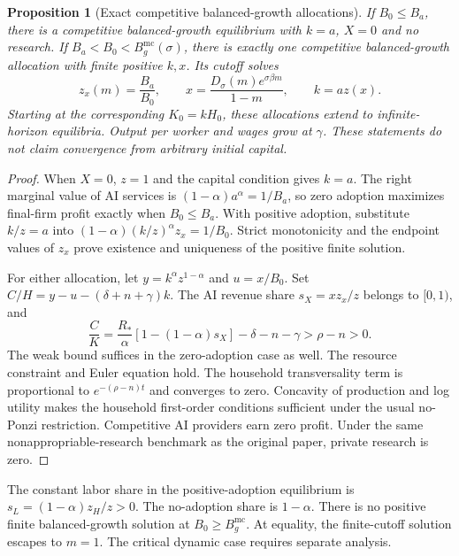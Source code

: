 \documentclass[11pt]{article}
\newtheorem{proposition}{Proposition}
\begin{document}
\begin{proposition}[Exact competitive balanced-growth allocations]
If $B_0\leq B_a$, there is a competitive balanced-growth equilibrium with
$k=a$, $X=0$ and no research. If
$B_a<B_0<B_g^{\mathrm{mc}}(\sigma)$, there is exactly one competitive
balanced-growth allocation with finite positive $k,x$. Its cutoff solves
\begin{equation}
 z_x(m)=\frac{B_a}{B_0},\qquad
 x=\frac{D_\sigma(m)e^{\sigma\beta m}}{1-m},\qquad k=a z(x).
 \label{eq:regimes-coexistence}
\end{equation}
Starting at the corresponding $K_0=kH_0$, these allocations extend to
infinite-horizon equilibria. Output per worker and wages grow at $\gamma$.
These statements do not claim convergence from arbitrary initial capital.
\end{proposition}
\begin{proof}
When $X=0$, $z=1$ and the capital condition gives $k=a$.
The right marginal value of AI services is $(1-\alpha)a^\alpha=1/B_a$,
so zero adoption maximizes final-firm profit exactly when $B_0\leq B_a$.
With positive adoption, substitute $k/z=a$ into
$(1-\alpha)(k/z)^\alpha z_x=1/B_0$. Strict monotonicity and the endpoint
values of $z_x$ prove existence and uniqueness of the positive finite solution.

For either allocation, let $y=k^\alpha z^{1-\alpha}$ and $u=x/B_0$.
Set $C/H=y-u-(\delta+n+\gamma)k$. The AI revenue share
$s_X=xz_x/z$ belongs to $[0,1)$, and
\[
 \frac{C}{K}=\frac{R_*}{\alpha}
 [1-(1-\alpha)s_X]-\delta-n-\gamma>\rho-n>0.
\]
The weak bound suffices in the zero-adoption case as well.
The resource constraint and Euler equation hold. The household transversality
term is proportional to $e^{-(\rho-n)t}$ and converges to zero.
Concavity of production and log utility makes the household first-order
conditions sufficient under the usual no-Ponzi restriction. Competitive
AI providers earn zero profit. Under the same nonappropriable-research
benchmark as the original paper, private research is zero.
\end{proof}

The constant labor share in the positive-adoption equilibrium is
$s_L=(1-\alpha)z_H/z>0$. The no-adoption share is $1-\alpha$.
There is no positive finite balanced-growth solution at
$B_0\geq B_g^{\mathrm{mc}}$. At equality, the finite-cutoff solution escapes
to $m=1$. The critical dynamic case requires separate analysis.
\end{document}
